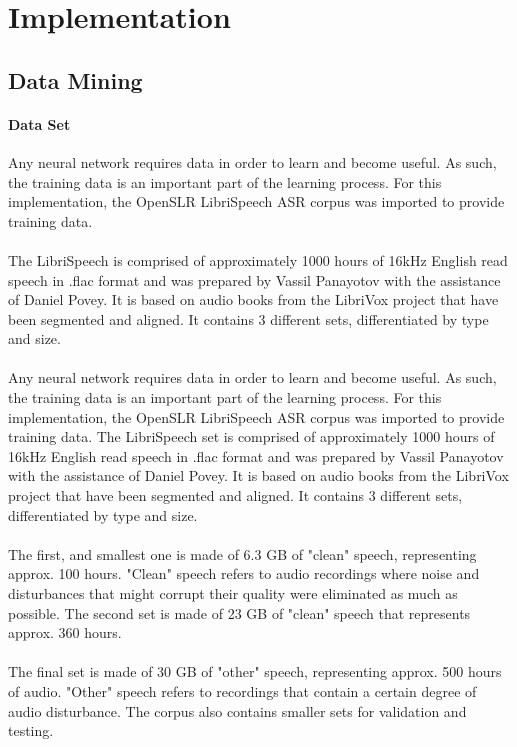 \chapter{Implementation}\label{ch:implementation}

\section{Data Mining} \label{sec:DataMining}
\subsubsection{Data Set}
Any neural network requires data in order to learn and become useful. As such, the training data is an important part of the learning process. For this implementation, the OpenSLR LibriSpeech ASR corpus was imported to provide training data.\\\\
The LibriSpeech is comprised of approximately 1000 hours of 16kHz English read speech in .flac format and was prepared by Vassil Panayotov with the assistance of Daniel Povey. It is based on audio books from the LibriVox project that have been segmented and aligned. It contains 3 different sets, differentiated by type and size.\\\\
Any neural network requires data in order to learn and become useful. As such, the training data is an important part of the learning process. For this implementation, the OpenSLR LibriSpeech ASR corpus was imported to provide training data.
The LibriSpeech set is comprised of approximately 1000 hours of 16kHz English read speech in .flac format and was prepared by Vassil Panayotov with the assistance of Daniel Povey. It is based on audio books from the LibriVox project that have been segmented and aligned. It contains 3 different sets, differentiated by type and size.\\\\
The first, and smallest one is made of 6.3 GB of "clean" speech, representing approx. 100 hours. "Clean" speech refers to audio recordings where noise and disturbances that might corrupt their quality were eliminated as much as possible.
The second set is made of 23 GB of "clean" speech that represents approx. 360 hours.\\\\
The final set is made of 30 GB of "other" speech, representing approx. 500 hours of audio. "Other" speech refers to recordings that contain a certain degree of audio disturbance.
The corpus also contains smaller sets for validation and testing.

